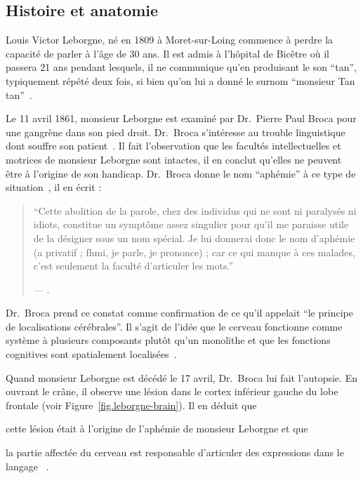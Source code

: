 \subsection{Histoire et anatomie}

Louis Victor Leborgne, né en 1809 à Moret-sur-Loing commence à perdre 
la capacité de parler à l'âge de 30 ans.
Il est admis à l'hôpital de Bicêtre où il passera 21 ans pendant lesquels, 
il ne communique qu'en produisant le son ``tan'', typiquement répété deux fois, 
si bien qu'on lui a donné le surnom ``monsieur Tan tan''~\cite{Mohammed_Narayan_Patra_Nanda_2018}.

Le 11 avril 1861, monsieur Leborgne est examiné par Dr.~Pierre Paul Broca 
pour une gangrène dans son pied droit.
Dr.~Broca s'intéresse au trouble linguistique dont souffre son patient~\cite{Lorch_2011}.
Il fait l'observation que les facultés intellectuelles et motrices de monsieur Leborgne sont intactes,
il en conclut qu'elles ne peuvent être à l'origine de son handicap. 
Dr.~Broca donne le nom ``aphémie'' à ce type de situation~\cite{Broca}, il en écrit :

\begin{quotation}
    ``Cette abolition de la parole, chez des individus qui ne sont ni paralysés ni idiots, constitue un symptôme assez singulier pour qu'il me paraisse utile de la désigner sous un nom spécial. Je lui donnerai donc le nom d'aphémie (\textgreek{a} privatif ; \textgreek{fhmi}, je parle, je prononce) ; car ce qui manque à ces malades, c'est seulement la faculté d'articuler les mots.''
    \begin{flushright}
        \rm --- .
    \end{flushright}
\end{quotation}

Dr.~Broca prend ce constat comme confirmation de ce qu'il appelait 
``le principe de localisations cérébrales''.
Il s'agit de l'idée que le cerveau fonctionne comme système à plusieurs composants plutôt qu'un monolithe
et que les fonctions cognitives sont spatialement localisées~\cite{Fodor_1983}.

Quand monsieur Leborgne est décédé le 17 avril, Dr.~Broca lui fait l'autopsie.
En ouvrant le crâne, il observe une lésion dans le cortex inférieur gauche du lobe frontale 
(voir Figure~\ref{fig.leborgne-brain}).
Il en déduit que 
\begin{enumerate*}[label=(\arabic*)]
    \item cette lésion était à l'origine de l'aphémie de monsieur Leborgne et que 
    \item la partie affectée du cerveau est responsable d'articuler des expressions dans le langage%
    ~\cite{Broca,Lorch_2011,Mohammed_Narayan_Patra_Nanda_2018}.
\end{enumerate*}

